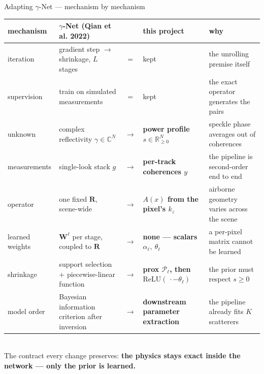 \begin{frame}{Adapting $\gamma$-Net --- mechanism by mechanism}
  \centering
  \scriptsize
  \renewcommand{\arraystretch}{2.05}
  \setlength{\tabcolsep}{3pt}
  \begin{tabular}{@{}l l c l l@{}}
    \toprule
    mechanism & $\gamma$-Net (Qian et al. 2022) & & this project & why \\
    \midrule
    iteration       & \textcolor{soft}{gradient step $\to$ shrinkage, $L$ stages} & $=$   & \textcolor{soft}{kept} & the unrolling premise itself \\
    supervision     & \textcolor{soft}{train on simulated measurements}           & $=$   & \textcolor{soft}{kept} & the exact operator generates the pairs \\
    \addlinespace
    unknown         & complex reflectivity $\gamma \in \mathbb{C}^{N}$            & $\to$ & \textbf{power profile $s \in \mathbb{R}_{\ge 0}^{N}$} & speckle phase averages out of coherences \\
    measurements    & single-look stack $g$                                       & $\to$ & \textbf{per-track coherences $y$}                     & the pipeline is second-order end to end \\
    operator        & one fixed $\mathbf{R}$, scene-wide                          & $\to$ & \textbf{\textcolor{good}{$A(x)$ from the pixel's $k_z$}} & airborne geometry varies across the scene \\
    learned weights & $\mathbf{W}^{\ell}$ per stage, coupled to $\mathbf{R}$      & $\to$ & \textbf{\textcolor{accent}{none --- scalars $\alpha_\ell,\ \theta_\ell$}} & a per-pixel matrix cannot be learned \\
    shrinkage       & support selection + piecewise-linear function               & $\to$ & \textbf{\textcolor{accent}{prox $\mathcal{P}_\ell$, then $\mathrm{ReLU}(\,\cdot - \theta_\ell)$}} & the prior must respect $s \ge 0$ \\
    model order     & Bayesian information criterion after inversion              & $\to$ & \textbf{downstream parameter extraction}              & the pipeline already fits $K$ scatterers \\
    \bottomrule
  \end{tabular}
  \\[8pt]
  {\small The contract every change preserves: \textbf{the physics stays exact inside
   the network --- only the prior is learned.}}

\end{frame}
